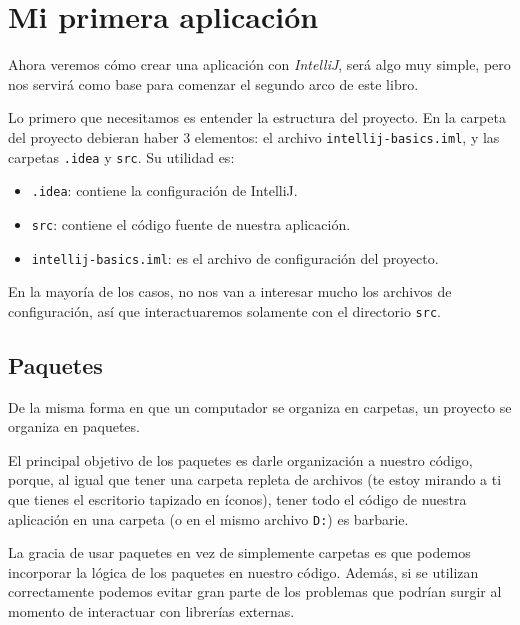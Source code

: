 \section{Mi primera aplicación}
  Ahora veremos cómo crear una aplicación con \textit{IntelliJ}, será algo muy simple, pero nos
  servirá como base para comenzar el segundo arco de este libro.

  Lo primero que necesitamos es entender la estructura del proyecto.
  En la carpeta del proyecto debieran haber 3 elementos: el archivo \texttt{intellij-basics.iml}, y 
  las carpetas \texttt{.idea} y \texttt{src}.
  Su utilidad es:
  \begin{itemize}
    \item \texttt{.idea}: contiene la configuración de IntelliJ.
    \item \texttt{src}: contiene el código fuente de nuestra aplicación.
    \item \texttt{intellij-basics.iml}: es el archivo de configuración del proyecto.
  \end{itemize}

  En la mayoría de los casos, no nos van a interesar mucho los archivos de configuración, así que
  interactuaremos solamente con el directorio \texttt{src}.

  \subsection{Paquetes}
    De la misma forma en que un computador se organiza en carpetas, un proyecto se organiza en 
    paquetes.

    El principal objetivo de los paquetes es darle organización a nuestro código, porque, al igual 
    que tener una carpeta repleta de archivos (te estoy mirando a ti que tienes el escritorio 
    tapizado en íconos), tener todo el código de nuestra aplicación en una carpeta (o en el mismo 
    archivo \texttt{D:}) es barbarie.

    La gracia de usar paquetes en vez de simplemente carpetas es que podemos incorporar la lógica de
    los paquetes en nuestro código.
    Además, si se utilizan correctamente podemos evitar gran parte de los problemas que podrían
    surgir al momento de interactuar con librerías externas.
    
